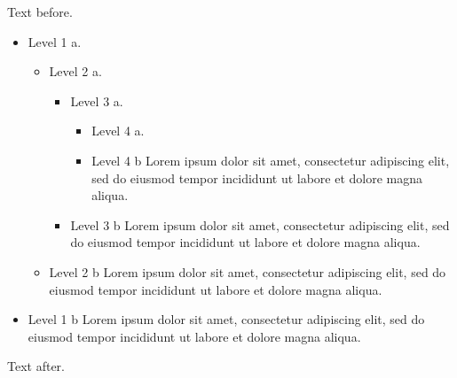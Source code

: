 \documentclass[10pt]{article}
\begin{document}
Text before.
\begin{itemize}
\item Level 1 a.
\begin{itemize}
\item Level 2 a.
\begin{itemize}
\item Level 3 a.
\begin{itemize}
\item Level 4 a.
\item Level 4 b Lorem ipsum dolor sit amet, consectetur adipiscing elit, sed do eiusmod tempor incididunt ut labore et dolore magna aliqua.
\end{itemize}
\item Level 3 b Lorem ipsum dolor sit amet, consectetur adipiscing elit, sed do eiusmod tempor incididunt ut labore et dolore magna aliqua.
\end{itemize}
\item Level 2 b Lorem ipsum dolor sit amet, consectetur adipiscing elit, sed do eiusmod tempor incididunt ut labore et dolore magna aliqua.
\end{itemize}
\item Level 1 b Lorem ipsum dolor sit amet, consectetur adipiscing elit, sed do eiusmod tempor incididunt ut labore et dolore magna aliqua.
\end{itemize}
Text after.
\end{document}
